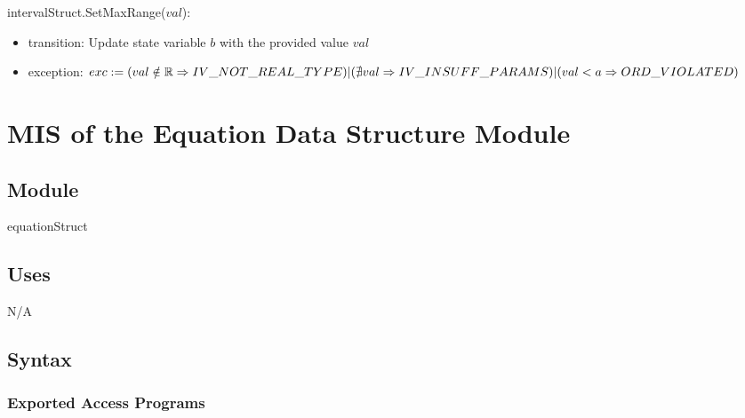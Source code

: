 \documentclass[12pt, titlepage]{article}
\begin{document}
\noindent intervalStruct.SetMaxRange($val$):
\begin{itemize}
	\item transition: Update state variable $b$ with the provided value $val$
	\item exception: $exc := \\
	(val \notin \mathbb{R} \Rightarrow IV\_NOT\_REAL\_TYPE) \\
	|\\
	(\nexists val \Rightarrow IV\_INSUFF\_PARAMS) \\
	|\\
	(val < a \Rightarrow ORD\_VIOLATED)$
\end{itemize}

\newpage

\section{MIS of the Equation Data Structure Module} 
\label{Module_equationdatastructure}

\subsection{Module}

equationStruct

\subsection{Uses}

N/A

\subsection{Syntax}

\subsubsection{Exported Access Programs}
\end{document}
